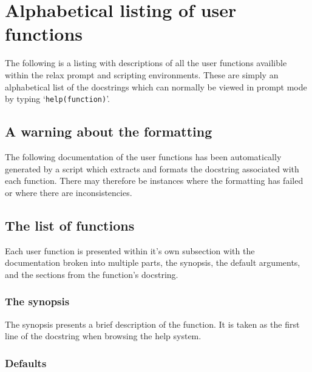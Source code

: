 
\chapter{Alphabetical listing of user functions}

The following is a listing with descriptions of all the user functions availible within the relax prompt and scripting environments.  These are simply an alphabetical list of the docstrings which can normally be viewed in prompt mode by typing `\texttt{help(function)}'.





\section{A warning about the formatting}

The following documentation of the user functions has been automatically generated by a script which extracts and formats the docstring associated with each function.  There may therefore be instances where the formatting has failed or where there are inconsistencies.




\section{The list of functions}

Each user function is presented within it's own subsection with the documentation broken into multiple parts, the synopsis, the default arguments, and the sections from the function's docstring.


\subsection{The synopsis}

The synopsis presents a brief description of the function.  It is taken as the first line of the docstring when browsing the help system.


\subsection{Defaults}

